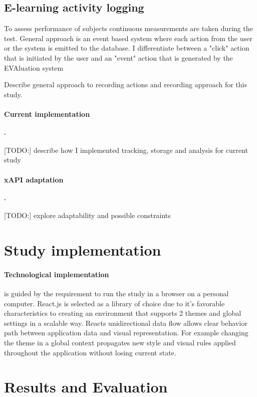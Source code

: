 	\subsection{E-learning activity logging}
	
	To assess performance of subjects continuous measurements are taken during the test. General approach is an event based system where each action from the user or the system is emitted to the database. I differentiate between a "click" action that is initiated by the user and an "event" action that is generated by the EVAluation system
	
	Describe general approach to recording actions and recording approach for this study.
		
		\paragraph{Current implementation} -
		
		[TODO:] describe how I implemented tracking, storage and analysis for current study
		
		\paragraph{xAPI adaptation} - 
		
		[TODO:] explore adaptability and possible constraints

\section{Study implementation}



\paragraph{Technological implementation} is guided by the requirement to run the study in a browser on a personal computer. React.js is selected as a library of choice due to it's favorable characteristics to creating an environment that supports 2 themes and global settings in a scalable way. Reacts unidirectional data flow
allows clear behavior path between application data and visual representation. For example changing the theme in a global context propagates new style and visual rules applied throughout the application without losing current state.

\section{Results and Evaluation}


